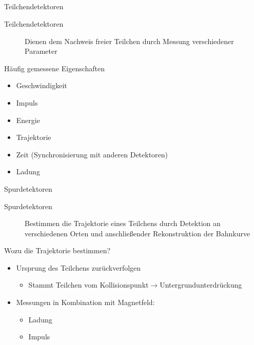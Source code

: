 
\subsection[]{}

\begin{frame}{Teilchendetektoren}
	\begin{description}
	  \item[Teilchendetektoren] Dienen dem Nachweis freier Teilchen durch Messung
	  verschiedener Parameter
	\end{description}
	
	\begin{block}{Häufig gemessene Eigenschaften}
		\begin{itemize}\setlength{\itemsep}{+5pt}
		  \item Geschwindigkeit
		  \item Impuls
		  \item Energie
		  \item Trajektorie
		  \item Zeit (Synchronisierung mit anderen Detektoren)
		  \item Ladung
		\end{itemize}
	\end{block}
\end{frame}


	\begin{frame}{Spurdetektoren}
	\begin{description}
	  \item[Spurdetektoren] Bestimmen die Trajektorie eines Teilchens durch
	  Detektion an verschiedenen Orten und anschließender Rekonstruktion der
	  Bahnkurve
	\end{description}
	\begin{block}{Wozu die Trajektorie bestimmen?}
		\begin{itemize}\setlength{\itemsep}{+5pt}
		  \item Ursprung des Teilchens zurückverfolgen
		  	\begin{itemize}\setlength{\itemsep}{+5pt}
		    	\item Stammt Teilchen vom
		    	Kollisionspunkt$\rightarrow$Untergrundunterdrückung
		  	\end{itemize}
		  \item Messungen in Kombination mit Magnetfeld:
		   	\begin{itemize}\setlength{\itemsep}{+5pt}
		    	\item Ladung
		    	\item Impuls
		  	\end{itemize}
		\end{itemize}
	\end{block}
\end{frame}


